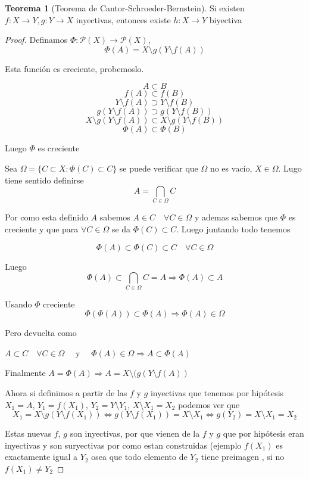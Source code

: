 \documentclass[12pt]{article}
\newcommand{\Ra}{\Rightarrow}
\newcommand{\ra}{\rightarrow}
\theoremstyle{definition}
\newtheorem{theorem}{Teorema}
\begin{document}
\begin{theorem}[Teorema de Cantor-Schroeder-Bernstein]
  Si existen $f: X \ra Y, g:Y \ra X$ inyectivas, entonces existe $h:X \ra Y$ biyectiva
  \begin{proof}
    Definamos $\Phi: \mathcal{P}(X) \ra \mathcal{P}(X)$,
    $$\Phi (A) = X \setminus g(Y \setminus f(A)) $$

   Esta función es creciente, probemoslo.

   $$ A \subset B $$ 
   $$ f(A) \subset f(B)$$
   $$ Y \setminus f(A) \supset Y \setminus f(B)$$
   $$ g(Y \setminus f(A)) \supset g(Y \setminus f(B))$$
   $$ X \setminus g(Y \setminus f(A)) \subset X \setminus g(Y \setminus f(B)) $$ 
   $$ \Phi (A) \subset \Phi (B)$$
 
Luego $\Phi$ es creciente

Sea $\Omega = \{C \subset X : \Phi (C) \subset C \} $ se puede verificar que $\Omega$ no es vacío, $X \in \Omega$. Lugo tiene sentido definirse
$$ A = \bigcap_{C \in \Omega} C$$

Por como esta definido $A$ sabemos $A \in C \quad \forall C \in \Omega$ y ademas sabemos que $\Phi$ es creciente y que para $\forall C \in \Omega$ se da  $\Phi(C) \subset C$. Luego juntando todo tenemos

$$ \Phi (A) \subset \Phi (C) \subset C \quad \forall C \in \Omega$$

Luego $$ \Phi (A) \subset \bigcap_{C \in \Omega} C = A \Ra \Phi (A) \subset A$$

Usando $\Phi$ creciente $$ \Phi (\Phi (A)) \subset \Phi (A) \Ra \Phi (A) \in \Omega$$

Pero devuelta como 
\begin{center} $A \subset C \quad \forall C \in \Omega \quad $ y $\quad \Phi (A) \in \Omega \Ra A \subset \Phi (A) $ \end{center}
  
Finalmente $ A = \Phi (A) \Ra A = X \setminus (g(Y \setminus f(A)) $

  Ahora si definimos a partir de las $f$ y $g$ inyectivas que tenemos por hipótesis $X_{1} = A$, $Y_{1} = f(X_{1})$, $Y_{2} = Y \setminus Y_{1}$, $X \setminus X_{1} = X_{2}$ podemos ver que $$ X_{1} = X \setminus g (Y \setminus f(X_{1})) \iff g(Y \setminus f(X_{1})) = X \setminus X_{1} \iff g(Y_{2}) = X \setminus X_{1} = X_{2}$$ 
  
  Estas nuevas $f$, $g$ son inyectivas, por que vienen de la $f$ y $g$ que por hipótesis eran inyectivas y son suryectivas por como estan construidas (ejemplo $f(X_{1})$ es exactamente igual a $Y_{2}$ osea que todo elemento de $Y_{2}$ tiene preimagen , si no $f(X_{1}) \neq Y_{2}$


\end{proof}
\end{theorem}
\end{document}
